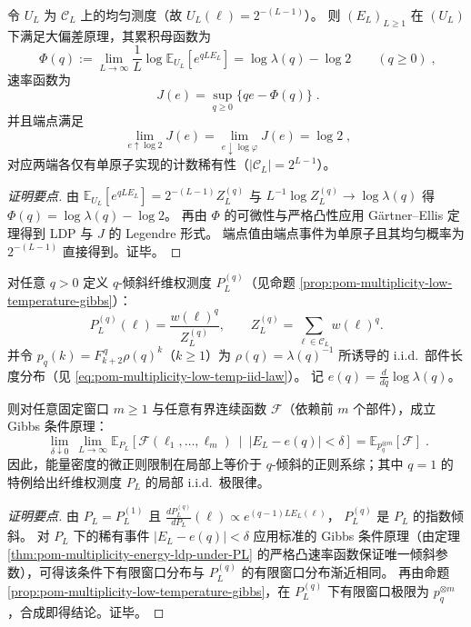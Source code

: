 \begin{theorem}\label{thm:pom-multiplicity-energy-ldp-uniform}
令 \(U_L\) 为 \(\mathcal{C}_L\) 上的均匀测度（故 \(U_L(\boldsymbol{\ell})=2^{-(L-1)}\)）。
则 \((E_L)_{L\ge 1}\) 在 \((U_L)\) 下满足大偏差原理，其累积母函数为
\[
\boxed{\;
\Phi(q):=\lim_{L\to\infty}\frac{1}{L}\log\mathbb{E}_{U_L}\!\left[e^{qLE_L}\right]
=\log\lambda(q)-\log 2\qquad(q\ge 0)\; } ,
\]
速率函数为
\[
\boxed{\;
J(e)=\sup_{q\ge 0}\bigl\{q e-\Phi(q)\bigr\}\; } .
\]
并且端点满足
\[
\boxed{\;
\lim_{e\uparrow\log 2}J(e)=\lim_{e\downarrow\log\varphi}J(e)=\log 2\; } ,
\]
对应两端各仅有单原子实现的计数稀有性（\(|\mathcal{C}_L|=2^{L-1}\)）。
\end{theorem}
\begin{proof}[证明要点]
由 \(\mathbb{E}_{U_L}[e^{qLE_L}]=2^{-(L-1)}Z_L^{(q)}\) 与 \(L^{-1}\log Z_L^{(q)}\to\log\lambda(q)\) 得 \(\Phi(q)=\log\lambda(q)-\log 2\)。
再由 \(\Phi\) 的可微性与严格凸性应用 G\"artner--Ellis 定理得到 LDP 与 \(J\) 的 Legendre 形式。
端点值由端点事件为单原子且其均匀概率为 \(2^{-(L-1)}\) 直接得到。证毕。
\end{proof}

\begin{theorem}\label{thm:pom-multiplicity-ensemble-equivalence}
对任意 \(q>0\) 定义 \(q\)-倾斜纤维权测度 \(P_L^{(q)}\)（见命题 \ref{prop:pom-multiplicity-low-temperature-gibbs}）：
\[
P_L^{(q)}(\boldsymbol{\ell})=\frac{w(\boldsymbol{\ell})^{q}}{Z_L^{(q)}},
\qquad
Z_L^{(q)}=\sum_{\boldsymbol{\ell}\in\mathcal{C}_L}w(\boldsymbol{\ell})^{q}.
\]
并令 \(p_q(k)=F_{k+2}^{\,q}\rho(q)^k\)（\(k\ge 1\)）为 \(\rho(q)=\lambda(q)^{-1}\) 所诱导的 i.i.d.\ 部件长度分布（见 \eqref{eq:pom-multiplicity-low-temp-iid-law}）。
记 \(e(q)=\frac{d}{dq}\log\lambda(q)\)。
\par
则对任意固定窗口 \(m\ge 1\) 与任意有界连续函数 \(\mathcal{F}\)（依赖前 \(m\) 个部件），成立 Gibbs 条件原理：
\[
\boxed{\;
\lim_{\delta\downarrow 0}\ \lim_{L\to\infty}
\mathbb{E}_{P_L}\!\left[\mathcal{F}(\ell_1,\dots,\ell_m)\ \middle|\ |E_L-e(q)|<\delta\right]
=\mathbb{E}_{p_q^{\otimes m}}[\mathcal{F}]\; } .
\]
因此，能量密度的微正则限制在局部上等价于 \(q\)-倾斜的正则系综；其中 \(q=1\) 的特例给出纤维权测度 \(P_L\) 的局部 i.i.d.\ 极限律。
\end{theorem}
\begin{proof}[证明要点]
由 \(P_L=P_L^{(1)}\) 且
\(
\frac{dP_L^{(q)}}{dP_L}(\boldsymbol{\ell})\propto e^{(q-1)LE_L(\boldsymbol{\ell})}
\)，
\(P_L^{(q)}\) 是 \(P_L\) 的指数倾斜。
对 \(P_L\) 下的稀有事件 \(|E_L-e(q)|<\delta\) 应用标准的 Gibbs 条件原理（由定理 \ref{thm:pom-multiplicity-energy-ldp-under-PL} 的严格凸速率函数保证唯一倾斜参数），可得该条件下有限窗口分布与 \(P_L^{(q)}\) 的有限窗口分布渐近相同。
再由命题 \ref{prop:pom-multiplicity-low-temperature-gibbs}，在 \(P_L^{(q)}\) 下有限窗口极限为 \(p_q^{\otimes m}\)，合成即得结论。证毕。
\end{proof}

\endinput
